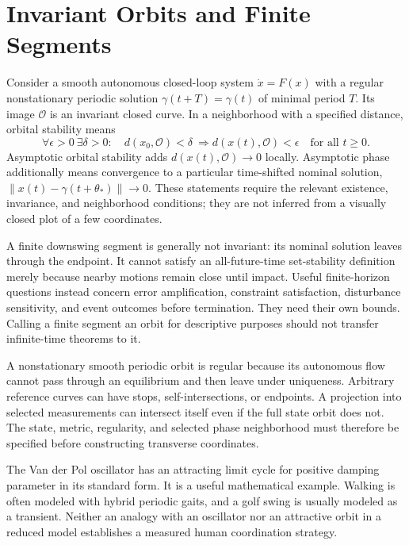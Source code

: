 \section{Invariant Orbits and Finite Segments}

Consider a smooth autonomous closed-loop system $\dot x=F(x)$ with a regular
nonstationary periodic solution $\gamma(t+T)=\gamma(t)$ of minimal period $T$.
Its image $\mathcal O$ is an invariant closed curve. In a neighborhood with a
specified distance, orbital stability means
\begin{equation}\label{eq:orbital_stability}
 \forall\epsilon>0\ \exists\delta>0:\quad
 d(x_0,\mathcal O)<\delta\ \Longrightarrow
 d(x(t),\mathcal O)<\epsilon\quad\text{for all }t\geq0.
\end{equation}
Asymptotic orbital stability adds $d(x(t),\mathcal O)\to0$ locally. Asymptotic
phase additionally means convergence to a particular time-shifted nominal
solution, $\|x(t)-\gamma(t+\theta_*)\|\to0$. These statements require the
relevant existence, invariance, and neighborhood conditions; they are not
inferred from a visually closed plot of a few coordinates.

A finite downswing segment is generally not invariant: its nominal solution
leaves through the endpoint. It cannot satisfy an all-future-time set-stability
definition merely because nearby motions remain close until impact. Useful
finite-horizon questions instead concern error amplification, constraint
satisfaction, disturbance sensitivity, and event outcomes before termination.
They need their own bounds. Calling a finite segment an orbit for descriptive
purposes should not transfer infinite-time theorems to it.

A nonstationary smooth periodic orbit is regular because its autonomous flow
cannot pass through an equilibrium and then leave under uniqueness. Arbitrary
reference curves can have stops, self-intersections, or endpoints. A projection
into selected measurements can intersect itself even if the full state orbit
does not. The state, metric, regularity, and selected phase neighborhood must
therefore be specified before constructing transverse coordinates.

The Van der Pol oscillator has an attracting limit cycle for positive damping
parameter in its standard form. It is a useful mathematical example. Walking
is often modeled with hybrid periodic gaits, and a golf swing is usually modeled
as a transient. Neither an analogy with an oscillator nor an attractive orbit
in a reduced model establishes a measured human coordination strategy.

